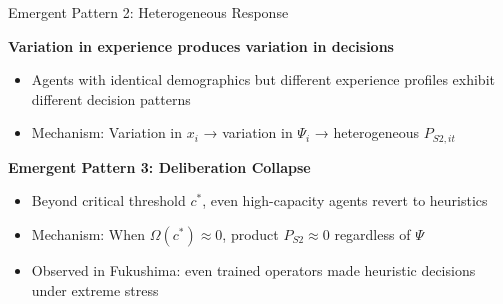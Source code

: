 \documentclass[aspectratio=169]{beamer}
\begin{document}
\begin{frame}{Emergent Pattern 2: Heterogeneous Response}

\textbf{Variation in experience produces variation in decisions}

\vspace{0.5em}

\begin{itemize}
    \item Agents with identical demographics but different experience profiles exhibit different decision patterns
    \item Mechanism: Variation in $x_i$ → variation in $\Psi_i$ → heterogeneous $P_{S2,it}$
\end{itemize}

\vspace{1em}

\textbf{Emergent Pattern 3: Deliberation Collapse}

\vspace{0.5em}

\begin{itemize}
    \item Beyond critical threshold $c^*$, even high-capacity agents revert to heuristics
    \item Mechanism: When $\Omega(c^*) \approx 0$, product $P_{S2} \approx 0$ regardless of $\Psi$
    \item Observed in Fukushima: even trained operators made heuristic decisions under extreme stress
\end{itemize}

\end{frame}
\end{document}
